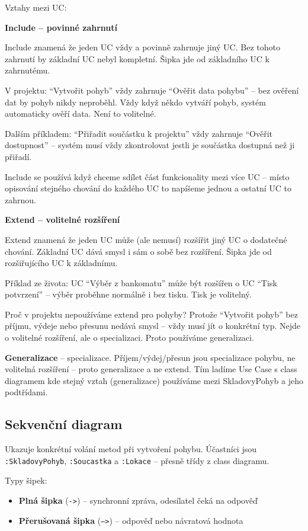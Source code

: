 \documentclass[12pt, a4paper]{article}
\begin{document}
Vztahy mezi UC:

\textbf{Include -- povinné zahrnutí}

Include znamená že jeden UC vždy a povinně zahrnuje jiný UC. Bez tohoto zahrnutí by základní UC nebyl kompletní. Šipka jde od základního UC k zahrnutému.

V projektu: ``Vytvořit pohyb'' vždy zahrnuje ``Ověřit data pohybu'' -- bez ověření dat by pohyb nikdy neproběhl. Vždy když někdo vytváří pohyb, systém automaticky ověří data. Není to volitelné.

Dalším příkladem: ``Přiřadit součástku k projektu'' vždy zahrnuje ``Ověřit dostupnost'' -- systém musí vždy zkontrolovat jestli je součástka dostupná než ji přiřadí.

Include se používá když chceme sdílet část funkcionality mezi více UC -- místo opisování stejného chování do každého UC to napíšeme jednou a ostatní UC to zahrnou.

\textbf{Extend -- volitelné rozšíření}

Extend znamená že jeden UC může (ale nemusí) rozšířit jiný UC o dodatečné chování. Základní UC dává smysl i sám o sobě bez rozšíření. Šipka jde od rozšiřujícího UC k základnímu.

Příklad ze života: UC ``Výběr z bankomatu'' může být rozšířen o UC ``Tisk potvrzení'' -- výběr proběhne normálně i bez tisku. Tisk je volitelný.

Proč v projektu nepoužíváme extend pro pohyby? Protože ``Vytvořit pohyb'' bez příjmu, výdeje nebo přesunu nedává smysl -- vždy musí jít o konkrétní typ. Nejde o volitelné rozšíření, ale o specializaci. Proto používáme generalizaci.

\textbf{Generalizace} -- specializace. Příjem/výdej/přesun jsou specializace pohybu, ne volitelná rozšíření -- proto generalizace a ne extend. Tím ladíme Use Case s class diagramem kde stejný vztah (generalizace) používáme mezi SkladovyPohyb a jeho podtřídami.

\subsection{Sekvenční diagram}

Ukazuje konkrétní volání metod při vytvoření pohybu. Účastníci jsou \texttt{:SkladovyPohyb}, \texttt{:Soucastka} a \texttt{:Lokace} -- přesně třídy z class diagramu.

Typy šipek:
\begin{itemize}
  \item \textbf{Plná šipka} (\texttt{->}) -- synchronní zpráva, odesílatel čeká na odpověď
  \item \textbf{Přerušovaná šipka} (\texttt{-->}) -- odpověď nebo návratová hodnota
\end{itemize}
\end{document}
